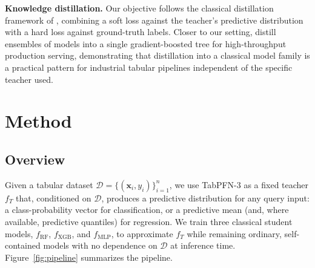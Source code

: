\documentclass[10pt]{article}
\begin{document}
\textbf{Knowledge distillation.} Our objective follows the classical
distillation framework of \citet{hinton2015distilling}, combining a
soft loss against the teacher's predictive distribution with a hard
loss against ground-truth labels. Closer to our setting,
\citet{lee2023practical} distill ensembles of models into a single
gradient-boosted tree for high-throughput production serving,
demonstrating that distillation into a classical model family is a
practical pattern for industrial tabular pipelines independent of the
specific teacher used.

\section{Method}
\label{sec:method}

\subsection{Overview}
Given a tabular dataset $\mathcal{D} = \{(\mathbf{x}_i, y_i)\}_{i=1}^n$,
we use TabPFN-3 as a fixed teacher $f_T$ that, conditioned on
$\mathcal{D}$, produces a predictive distribution for any query input:
a class-probability vector for classification, or a predictive mean
(and, where available, predictive quantiles) for regression. We train
three classical student models, $f_{\mathrm{RF}}$, $f_{\mathrm{XGB}}$,
and $f_{\mathrm{MLP}}$, to approximate $f_T$ while remaining
ordinary, self-contained models with no dependence on $\mathcal{D}$ at
inference time. Figure~\ref{fig:pipeline} summarizes the pipeline.
\end{document}
